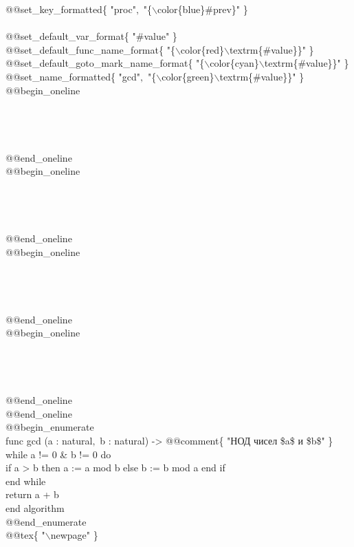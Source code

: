\tb @@set\_key\_formatted\{ "proc"$,$ "\{$\backslash$color\{blue\}\#prev\}" \} \\
\\
\tb @@set\_default\_var\_format\{ "\#value" \} \\
\tb @@set\_default\_func\_name\_format\{ "\{$\backslash$color\{red\}$\backslash$textrm\{\#value\}\}" \} \\
\tb @@set\_default\_goto\_mark\_name\_format\{ "\{$\backslash$color\{cyan\}$\backslash$textrm\{\#value\}\}" \} \\
\tb @@set\_name\_formatted\{ "gcd"$,$ "\{$\backslash$color\{green\}$\backslash$textrm\{\#value\}\}" \} \\
\tb @@begin\_oneline \\
\\
\\
\\
\\
\tb @@end\_oneline \\
\tb @@begin\_oneline \\
\\
\\
\\
\\
\tb @@end\_oneline \\
\tb @@begin\_oneline \\
\\
\\
\\
\\
\tb @@end\_oneline \\
\tb @@begin\_oneline \\
\\
\\
\\
\\
\tb @@end\_oneline \\
\tb @@end\_oneline \\
\tb @@begin\_enumerate \\
func gcd (a : natural$,$ b : natural) -> @@comment\{ "НОД чисел \$a\$ и \$b\$" \} \\
\tb while a != 0 \& b != 0 do \\
\tb \tb if a > b then a := a mod b else b := b mod a end if \\
\tb end while \\
\tb return a + b \\
end algorithm \\
\tb @@end\_enumerate \\
\tb @@tex\{ "$\backslash$newpage" \} \\
